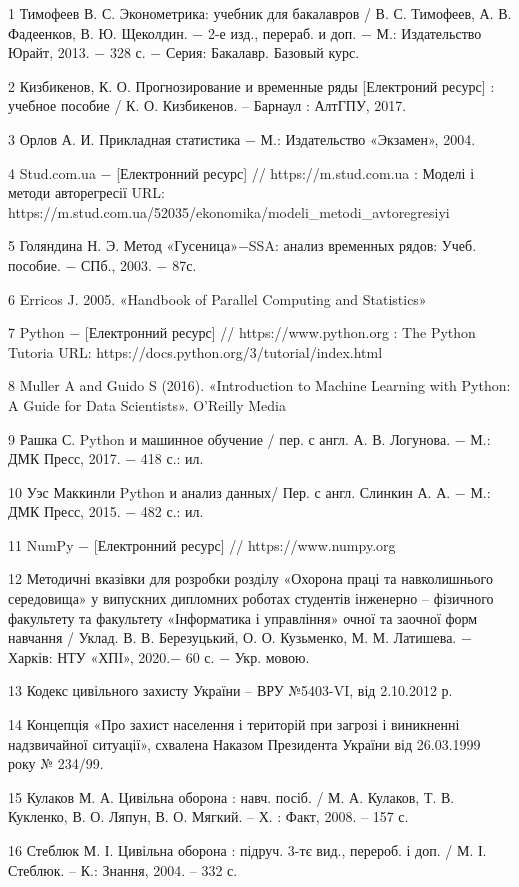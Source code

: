 
\hspace*{26pt} 1 Тимофеев В. С. Эконометрика: учебник для бакалавров / В. С. Тимофеев, А. В. Фадеенков, В. Ю. Щеколдин. $-$ 2-е изд., перераб. и доп. $-$ М.: Издательство Юрайт, 2013. $-$ 328 с. $-$ Серия: Бакалавр. Базовый курс.

2 Кизбикенов, К. О. Прогнозирование и временные ряды [Електроний ресурс] : учебное пособие / К. О. Кизбикенов. $–$ Барнаул : АлтГПУ, 2017.

3 Орлов А. И. Прикладная статистика $-$ М.: Издательство «Экзамен», 2004.

4 Stud.com.ua $-$ [Електронний ресурс] // https://m.stud.com.ua : Моделі і методи авторегресії URL: https://m.stud.com.ua/52035/ekonomika/modeli\_metodi\_avtoregresiyi

5 Голяндина Н. Э. Метод «Гусеница»$-$SSA: анализ временных рядов: Учеб. пособие. $-$ СПб., 2003. $-$ 87с.

6 Erricos J. 2005. «Handbook of Parallel Computing and Statistics»

7 Python $-$ [Електронний ресурс] // https://www.python.org :  The Python Tutoria URL: https://docs.python.org/3/tutorial/index.html

8 Muller A and Guido S (2016). «Introduction to Machine Learning with Python: A Guide for Data Scientists». O'Reilly Media

9 Рашка С. Python и машинное обучение / пер. с англ. А. В. Логунова. $-$ М.: ДМК Пресс, 2017. $-$ 418 с.: ил.

10 Уэс Маккинли Python и анализ данных/ Пер. с англ. Слинкин А. А. $-$ М.: ДМК Пресс, 2015. $-$ 482 с.: ил. 

11 NumPy $-$ [Електронний ресурс] // https://www.numpy.org

12 Методичні вказівки для розробки розділу «Охорона праці та навколишнього середовища» у випускних дипломних роботах студентів інженерно – фізичного факультету та факультету «Інформатика і управління» очної та заочної форм навчання / Уклад. В. В. Березуцький, О. О. Кузьменко, М. М. Латишева. − Харків: НТУ «ХПІ», 2020.− 60 с. − Укр. мовою.

13 Кодекс цивільного захисту України – ВРУ №5403-VI, від 2.10.2012 р.

14 Концепція «Про захист населення і територій при загрозі і виникненні надзвичайної ситуації», схвалена Наказом Президента України від 26.03.1999 року № 234/99.

15 Кулаков М. А. Цивільна оборона : навч. посіб. / М. А. Кулаков, Т. В. Кукленко, В. О. Ляпун, В. О. Мягкий. – Х. : Факт, 2008. – 157 с.

16 Стеблюк М. І. Цивільна оборона  : підруч. 3-тє вид., перероб. і доп. / М. І. Стеблюк. – К.: Знання, 2004. – 332 с.
